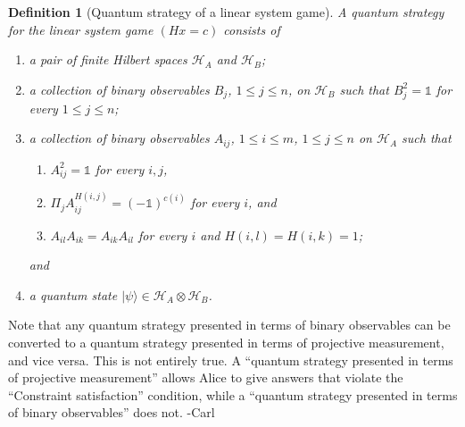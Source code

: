 \documentclass[11pt,letterpaper]{article}
\newcommand{\ket}[1]{|#1\rangle}
\newcommand{\x}{\otimes}
\newcommand{\calH}{\mathcal{H}}
\newcommand{\1}{\mathbb{1}}
\def\carl#1{{\color{blue} #1 -Carl}}
\newtheorem{definition}[theorem]{Definition}
\theoremstyle{definition}
\begin{document}
\begin{definition}[Quantum strategy of a linear system game]
\label{def:q_strat}
A quantum strategy for the linear system game $(Hx = c)$ consists of 
\begin{enumerate}
	\item a pair of finite Hilbert spaces $\calH_A$ and $\calH_B$;
	\item a collection of binary observables $B_j$, $1 \leq j \leq n$, on $\calH_B$
	such that $B_j^2 = \1$ for every $1 \leq j \leq n$;
	\item a collection of binary observables $A_{ij}$, $1\leq i \leq m$, $1\leq j\leq n$ 
	on $\calH_A$ such that 
	\begin{enumerate}
		\item $A_{ij}^2 = \1$ for every $i,j$,
		\item $\Pi_j A_{ij}^{H(i,j)} = (-\1)^{c(i)}$ for every $i$, and
		\item $A_{il}A_{ik} = A_{ik}A_{il}$ for every $i$ and $H(i,l) = H(i,k) =1$;
	\end{enumerate} 
	and
	\item a quantum state $\ket{\psi} \in \calH_A \x \calH_B$.
\end{enumerate}
\end{definition}
Note that any quantum strategy presented in terms of binary observables can be 
converted to a quantum strategy presented in terms of projective measurement, and
vice versa.  \carl{This is not entirely true.  A ``quantum strategy presented in terms of projective measurement'' allows
Alice to give answers that violate the ``Constraint satisfaction'' condition, while a ``quantum strategy presented 
in terms of binary observables'' does not.}
\end{document}
